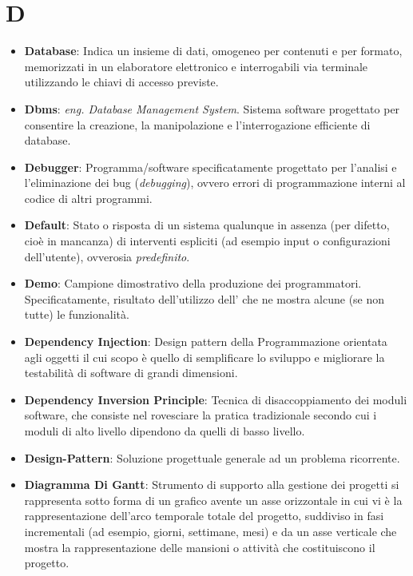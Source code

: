 \section*{D}
\begin{itemize}
	\item
	\textbf{Database}: Indica un insieme di dati, omogeneo per contenuti e per formato, memorizzati in un elaboratore elettronico e interrogabili via terminale utilizzando le chiavi di accesso previste.
	\item
	\textbf{Dbms}: \textit{eng. Database Management System}. Sistema software progettato per consentire la creazione, la manipolazione e l'interrogazione efficiente di database.
	\item
	\textbf{Debugger}: Programma/software specificatamente progettato per l'analisi e l'eliminazione dei bug (\textit{debugging}), ovvero errori di programmazione interni al codice di altri programmi.
	\item
	\textbf{Default}: Stato o risposta di un sistema qualunque in assenza (per difetto, cioè in mancanza) di interventi espliciti (ad esempio input o configurazioni dell'utente), ovverosia \textit{predefinito}.
	\item
	\textbf{Demo}: Campione dimostrativo della produzione dei programmatori. Specificatamente, risultato dell'utilizzo dell' che ne mostra alcune (se non tutte) le funzionalità.
	\item
	\textbf{Dependency Injection}: Design pattern della Programmazione orientata agli oggetti il cui scopo è quello di semplificare lo sviluppo e migliorare la testabilità di software di grandi dimensioni.
	\item
	\textbf{Dependency Inversion Principle}: Tecnica di disaccoppiamento dei moduli software, che consiste nel rovesciare la pratica tradizionale secondo cui i moduli di alto livello dipendono da quelli di basso livello.
	\item
	\textbf{Design-Pattern}: Soluzione progettuale generale ad un problema ricorrente.
	\item
	\textbf{Diagramma Di Gantt}: Strumento di supporto alla gestione dei progetti si rappresenta sotto forma di un grafico avente un asse orizzontale in cui vi è la rappresentazione dell'arco temporale totale del progetto, suddiviso in fasi incrementali (ad esempio, giorni, settimane, mesi) e da un asse verticale che mostra la rappresentazione delle mansioni o attività che costituiscono il progetto.
\end{itemize}
\newpage